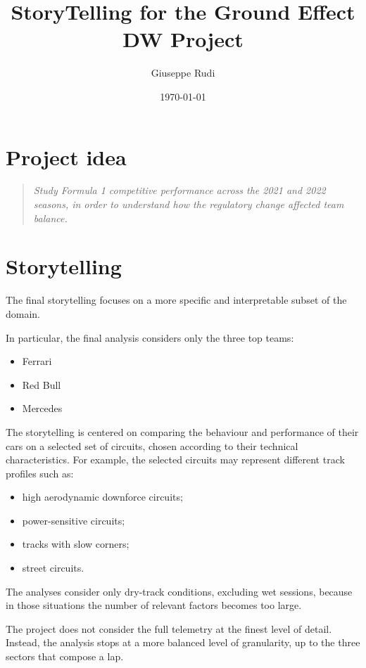 \documentclass[12pt,a4paper]{article}
\title{StoryTelling for the Ground Effect DW Project}
\author{Giuseppe Rudi}
\date{ \today}
\begin{document}
	
	\maketitle
	
	\section*{Project idea}
	
	\begin{quote}
		\textit{Study Formula 1 competitive performance across the 2021 and 2022 seasons, in order to understand how the regulatory change affected team balance.}
	\end{quote}
	
	\section*{Storytelling}
	
	The final storytelling focuses on a more specific and interpretable subset of the domain.
	
	In particular, the final analysis considers only the three top teams:
	\begin{itemize}
		\item Ferrari
		\item Red Bull
		\item Mercedes
	\end{itemize}
	
	The storytelling is centered on comparing the behaviour and performance of their cars on a selected set of circuits, chosen according to their technical characteristics. For example, the selected circuits may represent different track profiles such as:
	\begin{itemize}
		\item high aerodynamic downforce circuits;
		\item power-sensitive circuits;
		\item tracks with slow corners;
		\item street circuits.
	\end{itemize}
	
	The analyses consider only dry-track conditions, excluding wet sessions, because in those situations the number of relevant factors becomes too large.
	
	
	The project does not consider the full telemetry at the finest level of detail. Instead, the analysis stops at a more balanced level of granularity, up to the three sectors that compose a lap.
	
\end{document}
